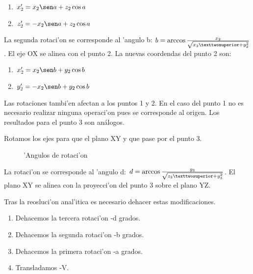 \begin{enumerate}
\item $x_2' = x_2 \sen a + z_2 \cos a$
\item $z_2' = - x_2 \sen a + z_2 \cos a$
\end{enumerate}

La segunda rotaci'on se corresponde al 'angulo b: $b = \arccos {x_2 \over {\sqrt{x_2²+y_2^2}}}$. El eje OX se alinea con el punto 2. La nuevas coordendas del punto 2 son:

\begin{enumerate}
\item $x_2' = x_2 \sen b + y_2 \cos b$
\item $y_2' = - x_2 \sen b + y_2 \cos b$
\end{enumerate}

Las rotaciones tambi'en afectan a los puntos 1 y 2. En el caso del punto 1 no es necesario realizar ninguna operaci'on pues se corresponde al origen. Los resultados para el punto 3 son análogos. \bigskip\newline

Rotamos los ejes para que el plano XY y que pase por el punto 3.

\begin{figure}[h!]
	\begin{center}
     	\end{center}
    	\caption{'Angulos de rotaci'on}\label{fig:triang5}
\end{figure}

La rotaci'on se corresponde al 'angulo d: $d = \arccos {y_3 \over {\sqrt{z_3²+y_3^2}}}$. El plano XY se alinea con la proyecci'on del punto 3 sobre el plano YZ. 

Tras la reosluci'on anal'itica es necesario dehacer estas modificaciones. 

\begin{enumerate}
\item Dehacemos la tercera rotaci'on -d grados.
\item Dehacemos la segunda rotaci'on -b grados.
\item Dehacemos la primera rotaci'on -a grados.
\item Transladamos -V.
\end{enumerate}

